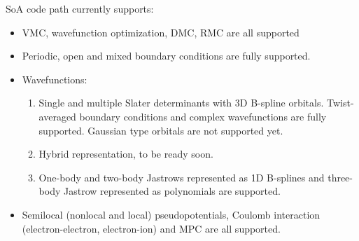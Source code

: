 SoA code path currently supports:
\begin{itemize}
  \item VMC, wavefunction optimization, DMC, RMC are all supported
  \item Periodic, open and mixed boundary conditions are fully supported.
  \item Wavefunctions:
    \begin{enumerate}
      \item Single and multiple Slater determinants with 3D B-spline orbitals. Twist-averaged boundary conditions and complex wavefunctions are fully supported. Gaussian type orbitals are not supported yet.
      \item Hybrid representation, to be ready soon.
      \item One-body and two-body Jastrows represented as 1D B-splines and three-body Jastrow represented as polynomials are supported.
    \end{enumerate}
  \item Semilocal (nonlocal and local) pseudopotentials, Coulomb interaction (electron-electron, electron-ion) and MPC are all supported.
\end{itemize}
